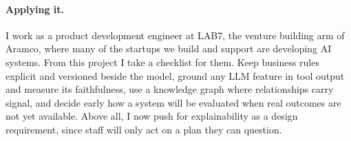 \paragraph{Applying it.} I work as a product development engineer at LAB7, the venture building arm of Aramco, where many of the startups we build and support are developing AI systems. From this project I take a checklist for them. Keep business rules explicit and versioned beside the model, ground any LLM feature in tool output and measure its faithfulness, use a knowledge graph where relationships carry signal, and decide early how a system will be evaluated when real outcomes are not yet available. Above all, I now push for explainability as a design requirement, since staff will only act on a plan they can question.
